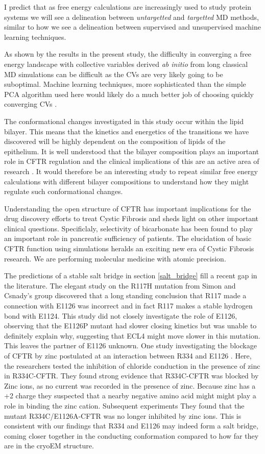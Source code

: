 I predict that as free energy calculations are increasingly used to study protein systems we will see a delineation between \textit{untargetted} and \textit{targetted} MD methods, similar to how we see a delineation between supervised and unsupervised machine learning techniques.

As shown by the results in the present study, the difficulty in converging a free energy landscape with collective variables derived \textit {ab initio} from long classical MD simulations can be difficult as the CVs are very likely going to be suboptimal. Machine learning techniques, more sophisticated than the simple PCA algorithm used here would likely do a much better job of choosing quickly converging CVs \cite{}. 

The conformational changes investigated in this study occur within the lipid bilayer. This means that the kinetics and energetics of the transitions we have discovered will be highly dependent on the composition of lipids of the epithelium. It is well understood that the bilayer composition plays an important role in CFTR regulation and the clinical implications of this are an active area of research \cite{cui2020, cottrill2020}. It would therefore be an interesting study to repeat similar free energy calculations with different bilayer compositions to understand how they might regulate such conformational changes.

Understanding the open structure of CFTR has important implications for the drug discovery efforts to treat Cystic Fibrosis and sheds light on other important clinical questions. Specificlaly, selectivity of bicarbonate has been found to play an important role in pancreatic sufficiency of patients. The elucidation of basic CFTR function using simulations heralds an exciting new era of Cystic Fibrosis research. We are performing molecular medicine with atomic precision. 

The predictions of a stable salt bridge in section \ref{salt_bridge} fill a recent gap in the literature. The elegant study on the R117H mutation from Simon and Csnady's group \cite{simon2021}  discovered that a long standing conclusion that R117 made a connection with E1126 was incorrect and in fact R117 makes a stable hydrogen bond with E1124. This study did not closely investigate the role of E1126, observing that the E1126P mutant had slower closing kinetics but was unable to definitely explain why, suggesting that ECL4 might move slower in this mutation. This leaves the partner of E1126 unknown. One study investigating the blockage of CFTR by zinc postulated at an interaction between R334 and E1126 \cite{wang2016}. Here, the researchers tested the inhibition of chloride conduction in the presence of zinc in R334C-CFTR. They found strong evidence that R334C-CFTR was blocked by Zinc ions, as no current was recorded in the presence of zinc. Because zinc has a +2 charge they suspected that a nearby negative amino acid might might play a role in binding the zinc cation. Subsequent experiments They found that the mutant R334C/E1126A-CFTR was no longer inhibited by zinc ions. This is consistent with our findings that R334 and E1126 may indeed form a salt bridge, coming closer together in the conducting conformation compared to how far they are in the cryoEM structure.  

